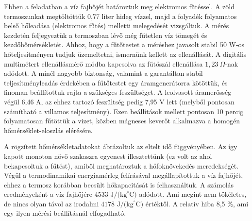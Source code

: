 \documentclass{article}
\begin{document}
Ebben a feladatban a víz fajhőjét határoztuk meg elektromos fűtéssel. A zöld termoszunkat megtöltöttük 0,77 liter hideg vízzel, majd a folyadék folyamatos belső hőleadása (elektromos fűtés) melletti melegedését vizsgáltuk. A mérés kezdetén feljegyeztük a termoszban lévő még fűtetlen víz tömegét és kezdőhőmérsékletét. Ahhoz, hogy a fűtőtestet a méréshez javasolt stabil 50 W-os hőteljesítményen tudjuk üzemeltetni, ismernünk kellett az ellenállását. A digitális multimétert ellenállásmérő módba kapcsolva az fűtőszál ellenállása $1,23\ \Omega$-nak adódott. A minél nagyobb biztonság, valamint a garantáltan stabil teljesítményleadás érdekében a fűtőtestet egy áramgenerátorra kötöttük, és finoman beállítottuk rajta a szükséges feszültséget. A leolvasott áramerősség végül 6,46 A, az ehhez tartozó feszültség pedig 7,95 V lett (melyből pontosan számítható a villamos teljesítmény). Ezen beállítások mellett pontosan 10 percig folyamatosan fűtöttük a vizet, közben mágneses keverőt alkalmazva a homogén hőmérséklet-eloszlás elérésére.

A rögzített hőmérsékletadatokat ábrázoltuk az eltelt idő függvényében. Az így kapott monoton növő szakaszra egyenest illesztettünk (ez volt az ahol bekapcsoltuk a fűtést), amiből meghatároztuk a hőfoknövekedés meredekségét. Végül a termodinamikai energiamérleg felírásával megállapítottuk a víz fajhőjét, ehhez a termosz korábban becsült hőkapacitását is felhasználtuk. A számolás eredményeként a víz fajhőjére $4533 \text{ J/(kg}^{\circ}\text{C)}$ adódott. Ami megint nem tökéletes, de nincs olyan távol az irodalmi $4178 \text{ J/(kg}^{\circ}\text{C)}$ értéktől. A relatív hiba 8,5 $\%$, ami egy ilyen mérési beállításnál elfogadható. 

\end{document}
